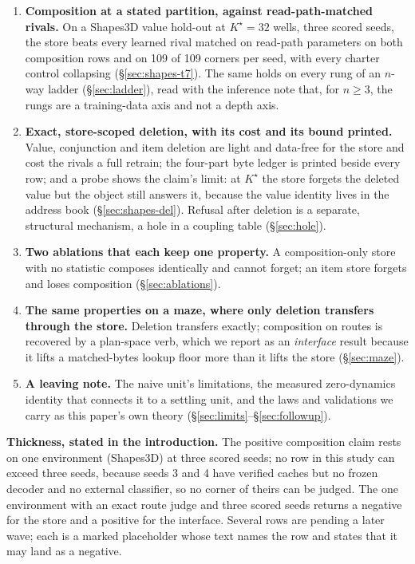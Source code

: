\documentclass{article} %
\newcommand{\Kstar}{\ensuremath{K^{\star}}}
\begin{document}
\begin{enumerate}[leftmargin=*,itemsep=2pt]
\item \textbf{Composition at a stated partition, against read-path-matched rivals.} On a
  Shapes3D value hold-out at $\Kstar=32$ wells, three scored seeds, the store beats every
  learned rival matched on read-path parameters on both composition rows and on 109 of 109
  corners per seed, with every charter control collapsing
  (\S\ref{sec:shapes-t7}). The same holds on every rung of an $n$-way ladder
  (\S\ref{sec:ladder}), read with the inference note that, for $n\ge3$, the rungs are a
  training-data axis and not a depth axis.
\item \textbf{Exact, store-scoped deletion, with its cost and its bound printed.} Value,
  conjunction and item deletion are light and data-free for the store and cost the rivals a
  full retrain; the four-part byte ledger is printed beside every row; and a probe shows the
  claim's limit: at $\Kstar$ the store forgets the deleted value but the object still answers
  it, because the value identity lives in the address book (\S\ref{sec:shapes-del}).
  Refusal after deletion is a separate, structural mechanism, a hole in a coupling table
  (\S\ref{sec:hole}).
\item \textbf{Two ablations that each keep one property.} A composition-only store with no
  statistic composes identically and cannot forget; an item store forgets and loses
  composition (\S\ref{sec:ablations}).
\item \textbf{The same properties on a maze, where only deletion transfers through the
  store.} Deletion transfers exactly; composition on routes is recovered by a plan-space
  verb, which we report as an \emph{interface} result because it lifts a matched-bytes lookup
  floor more than it lifts the store (\S\ref{sec:maze}).
\item \textbf{A leaving note.} The naive unit's limitations, the measured zero-dynamics
  identity that connects it to a settling unit, and the laws and validations we carry as this
  paper's own theory (\S\ref{sec:limits}--\S\ref{sec:followup}).
\end{enumerate}

\noindent\textbf{Thickness, stated in the introduction.} The positive composition claim rests
on one environment (Shapes3D) at three scored seeds; no row in this study can exceed three
seeds, because seeds 3 and 4 have verified caches but no frozen decoder and no external
classifier, so no corner of theirs can be judged. %
The one environment with an exact route judge and three scored seeds returns a negative for
the store and a positive for the interface. Several rows are pending a later wave; each is a
marked placeholder whose text names the row and states that it may land as a negative.
\end{document}
